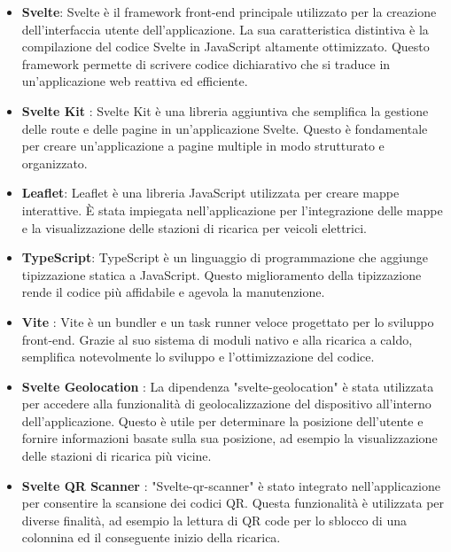 \begin{itemize}
      \item \textbf{Svelte}: Svelte è il framework front-end principale utilizzato per la creazione
            dell'interfaccia utente dell'applicazione. La sua caratteristica distintiva è la compilazione
            del codice Svelte in JavaScript altamente ottimizzato. Questo framework permette di scrivere
            codice dichiarativo che si traduce in un'applicazione web reattiva ed efficiente.

      \item \textbf{Svelte Kit} \cite{sveltekit}: Svelte Kit è una libreria aggiuntiva che semplifica la gestione
            delle route e delle pagine in un'applicazione Svelte. Questo è fondamentale per creare un'applicazione
            a pagine multiple in modo strutturato e organizzato.

      \item \textbf{Leaflet}: Leaflet è una libreria JavaScript utilizzata per creare mappe interattive.
            È stata impiegata nell'applicazione per l'integrazione delle mappe e la visualizzazione delle
            stazioni di ricarica per veicoli elettrici.

      \item \textbf{TypeScript}: TypeScript è un linguaggio di programmazione che aggiunge tipizzazione
            statica a JavaScript. Questo miglioramento della tipizzazione rende il codice più affidabile e
            agevola la manutenzione.

      \item \textbf{Vite} \cite{vite}: Vite è un bundler e un task runner veloce progettato per lo sviluppo
            front-end. Grazie al suo sistema di moduli nativo e alla ricarica a caldo, semplifica
            notevolmente lo sviluppo e l'ottimizzazione del codice.

      \item \textbf{Svelte Geolocation} \cite{sveltegeo}: La dipendenza "svelte-geolocation" è stata utilizzata per
            accedere alla funzionalità di geolocalizzazione del dispositivo all'interno dell'applicazione.
            Questo è utile per determinare la posizione dell'utente e fornire informazioni basate sulla
            sua posizione, ad esempio la visualizzazione delle stazioni di ricarica più vicine.

      \item \textbf{Svelte QR Scanner} \cite{scanner}: "Svelte-qr-scanner" è stato integrato nell'applicazione per
            consentire la scansione dei codici QR. Questa funzionalità è utilizzata per diverse finalità,
            ad esempio la lettura di QR code per lo sblocco di una colonnina ed il conseguente inizio della
            ricarica.
\end{itemize}

